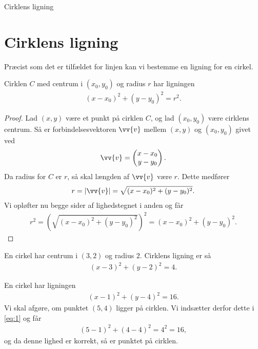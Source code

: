 \begin{center}
\Huge
Cirklens ligning
\end{center}

\section*{Cirklens ligning}
Præcist som det er tilfældet for linjen kan vi bestemme en ligning for en cirkel. 
\begin{setn}
	Cirklen $C$ med centrum i $(x_0,y_0)$ og radius $r$ har ligningen
	\begin{align*}
		(x-x_0)^2 + (y-y_0)^2 = r^2.
	\end{align*}
\end{setn}
\begin{proof}
	Lad $(x,y)$ være et punkt på cirklen $C$, og lad $(x_0,y_0)$ være cirklens centrum. Så er
	forbindelsesvektoren $\vv{v}$ mellem $(x,y)$ og $(x_0,y_0)$ givet ved
	\begin{align*}
		\vv{v} = 
		\begin{pmatrix}
			x-x_0 \\
			y-y_0
		\end{pmatrix}.
	\end{align*}
	Da radius for $C$ er $r$, så skal længden af $\vv{v}$ være $r$. Dette medfører
	\begin{align*}
		r = |\vv{v}| = \sqrt{(x-x_0)^2+(y-y_0)^2}. 
	\end{align*}
	Vi opløfter nu begge sider af lighedstegnet i anden og får
	\begin{align*}
		r^2 = \left(\sqrt{(x-x_0)^2+(y-y_0)^2}\right)^2 = (x-x_0)^2 + (y-y_0)^2.
	\end{align*}
\end{proof}

\begin{exa}
	En cirkel har centrum i $(3,2)$ og radius $2$. Cirklens ligning er så
	\begin{align*}
		(x-3)^2 + (y-2)^2 = 4.
	\end{align*}
\end{exa}

\begin{exa}
	En cirkel har ligningen 
	\begin{align}\label{eq:1}
		(x-1)^2 + (y-4)^2 = 16. 
	\end{align}
	Vi skal afgøre, om punktet $(5,4)$ ligger på cirklen. Vi indsætter derfor dette
	i \eqref{eq:1} og får
	\begin{align*}
		(5-1)^2 + (4-4)^2 = 4^2=16,
	\end{align*}
	og da denne lighed er korrekt, så er punktet på cirklen. 
\end{exa}


